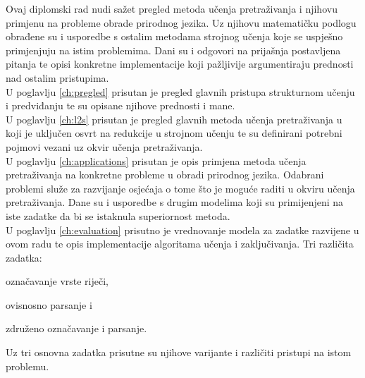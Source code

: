 Ovaj diplomski rad nudi sažet pregled metoda učenja pretraživanja i njihovu
primjenu na probleme obrade prirodnog jezika. Uz njihovu matematičku podlogu
obrađene su i usporedbe s ostalim metodama strojnog učenja koje se uspješno
primjenjuju na istim problemima. Dani su i odgovori na prijašnja postavljena
pitanja te opisi konkretne implementacije koji pažljivije argumentiraju
prednosti nad ostalim pristupima.
\\ \noindent
U poglavlju \ref{ch:pregled} prisutan je pregled glavnih pristupa strukturnom
učenju i predviđanju te su opisane njihove prednosti i mane.
\\ \noindent
U poglavlju \ref{ch:l2s} prisutan je pregled glavnih metoda učenja pretraživanja
u koji je uključen osvrt na redukcije u strojnom učenju te su definirani
potrebni pojmovi vezani uz okvir učenja pretraživanja.
\\ \noindent
U poglavlju \ref{ch:applications} prisutan je opis primjena metoda učenja
pretraživanja na konkretne probleme u obradi prirodnog jezika. Odabrani problemi
služe za razvijanje osjećaja o tome što je moguće raditi u okviru učenja
pretraživanja. Dane su i usporedbe s drugim modelima koji su primijenjeni na
iste zadatke da bi se istaknula superiornost \lts{} metoda.
\\ \noindent
U poglavlju \ref{ch:evaluation} prisutno je vrednovanje modela za zadatke
razvijene u ovom radu te opis implementacije algoritama učenja i zaključivanja.
Tri različita zadatka:
\begin{inlinelist}
  \item označavanje vrste riječi,
  \item ovisnosno parsanje i
  \item združeno označavanje i parsanje.
\end{inlinelist}
Uz tri osnovna zadatka prisutne su njihove varijante i različiti pristupi na
istom problemu.
